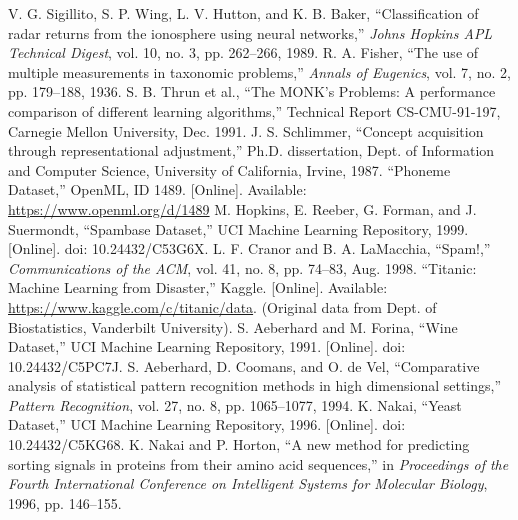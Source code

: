 \documentclass[conference]{IEEEtran}
\begin{document}
\begin{thebibliography}{99}
 V. G. Sigillito, S. P. Wing, L. V. Hutton, and K. B. Baker, “Classification of radar returns from the ionosphere using neural networks,” \textit{Johns Hopkins APL Technical Digest}, vol. 10, no. 3, pp. 262–266, 1989.
 R. A. Fisher, “The use of multiple measurements in taxonomic problems,” \textit{Annals of Eugenics}, vol. 7, no. 2, pp. 179–188, 1936.
 S. B. Thrun et al., “The MONK's Problems: A performance comparison of different learning algorithms,” Technical Report CS-CMU-91-197, Carnegie Mellon University, Dec. 1991.
 J. S. Schlimmer, “Concept acquisition through representational adjustment,” Ph.D. dissertation, Dept. of Information and Computer Science, University of California, Irvine, 1987.
 “Phoneme Dataset,” OpenML, ID 1489. [Online]. Available: \url{https://www.openml.org/d/1489}
 M. Hopkins, E. Reeber, G. Forman, and J. Suermondt, “Spambase Dataset,” UCI Machine Learning Repository, 1999. [Online]. doi: 10.24432/C53G6X.
 L. F. Cranor and B. A. LaMacchia, “Spam!,” \textit{Communications of the ACM}, vol. 41, no. 8, pp. 74–83, Aug. 1998.
 “Titanic: Machine Learning from Disaster,” Kaggle. [Online]. Available: \url{https://www.kaggle.com/c/titanic/data}. (Original data from Dept. of Biostatistics, Vanderbilt University).
 S. Aeberhard and M. Forina, “Wine Dataset,” UCI Machine Learning Repository, 1991. [Online]. doi: 10.24432/C5PC7J.
 S. Aeberhard, D. Coomans, and O. de Vel, “Comparative analysis of statistical pattern recognition methods in high dimensional settings,” \textit{Pattern Recognition}, vol. 27, no. 8, pp. 1065–1077, 1994.
 K. Nakai, “Yeast Dataset,” UCI Machine Learning Repository, 1996. [Online]. doi: 10.24432/C5KG68.
 K. Nakai and P. Horton, “A new method for predicting sorting signals in proteins from their amino acid sequences,” in \textit{Proceedings of the Fourth International Conference on Intelligent Systems for Molecular Biology}, 1996, pp. 146–155.
\end{thebibliography}
\end{document}
